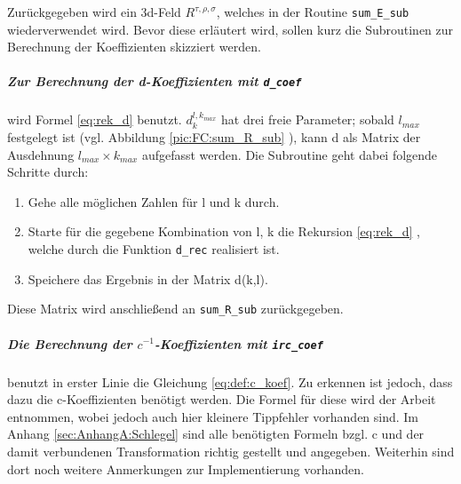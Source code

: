 %
Zurückgegeben wird ein 3d-Feld $R^{\tau,\rho,\sigma}$, 
welches in der Routine \texttt{sum\_E\_sub} wiederverwendet 
wird. Bevor diese erläutert wird, 
sollen kurz die Subroutinen zur Berechnung der Koeffizienten skizziert werden.
%
\subparagraph{Zur Berechnung der d-Koeffizienten mit \texttt{d\_coef}}
%
wird Formel \ref{eq:rek_d} benutzt. $d^{l,k_{max}}_{k}$ hat drei freie 
Parameter; sobald $l_{max}$ festgelegt ist (vgl. 
Abbildung 
\ref{pic:FC:sum_R_sub} ), kann d als Matrix der 
Ausdehnung $l_{max}\times k_{max}$ aufgefasst werden. Die 
Subroutine geht dabei folgende Schritte durch:
\begin{enumerate}
	\item Gehe alle möglichen Zahlen für l und k durch.
	\item Starte für die gegebene Kombination von l, k die Rekursion 
	\ref{eq:rek_d} , welche durch die Funktion \texttt{d\_rec} realisiert ist.
	\item Speichere das Ergebnis in der Matrix d(k,l).
\end{enumerate} 
Diese Matrix wird anschließend an \texttt{sum\_R\_sub} zurückgegeben. 
%
%
%
\subparagraph{Die Berechnung der $c^{-1}$-Koeffizienten mit \texttt{irc\_coef}}
%
benutzt in erster Linie die Gleichung \ref{eq:def:c_koef}. Zu erkennen ist 
jedoch, dass dazu die c-Koeffizienten benötigt werden. Die Formel für diese 
wird der Arbeit \cite{av:4a} entnommen, wobei jedoch auch hier kleinere 
Tippfehler vorhanden sind. Im Anhang \ref{sec:AnhangA:Schlegel} sind alle 
benötigten Formeln bzgl. c und der damit verbundenen Transformation richtig 
gestellt und angegeben.  Weiterhin sind dort noch weitere Anmerkungen zur 
Implementierung vorhanden. %
%
%
%

